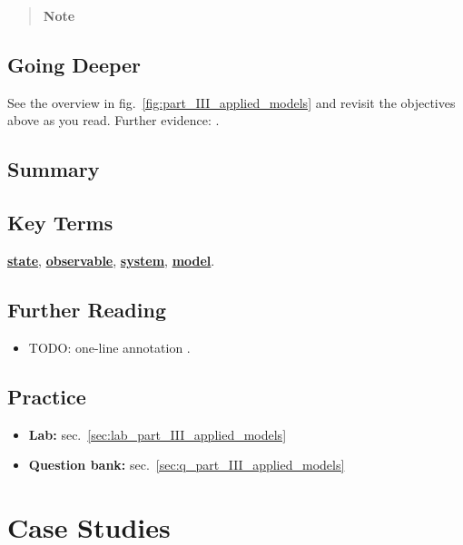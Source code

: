 \documentclass[
]{article}
\providecommand{\tightlist}{%
  \setlength{\itemsep}{0pt}\setlength{\parskip}{0pt}}
\theoremstyle{plain}
\theoremstyle{definition}
\begin{document}
\begin{quote}
\textbf{Note}
\end{quote}

\subsection{Going Deeper}\label{going-deeper-8}

See the overview in fig.~\ref{fig:part_III_applied_models} and revisit
the objectives above as you read. Further evidence:
\citep{patel2018models, nguyen2023synthesis}.

\subsection{Summary}\label{summary-9}

\subsection{Key Terms}\label{key-terms-9}

\hyperref[gl:state]{\textbf{state}},
\hyperref[gl:observable]{\textbf{observable}},
\hyperref[gl:system]{\textbf{system}},
\hyperref[gl:model]{\textbf{model}}.

\subsection{Further Reading}\label{further-reading-9}

\begin{itemize}
\item
  TODO: one-line annotation \citep{kim2020data}.
\end{itemize}

\subsection{Practice}\label{practice-9}

\begin{itemize}
\tightlist
\item
  \textbf{Lab:} sec.~\ref{sec:lab_part_III_applied_models}
\item
  \textbf{Question bank:} sec.~\ref{sec:q_part_III_applied_models}
\end{itemize}

\newpage

\section{Case Studies}\label{sec:part_III_case_studies}
\end{document}
